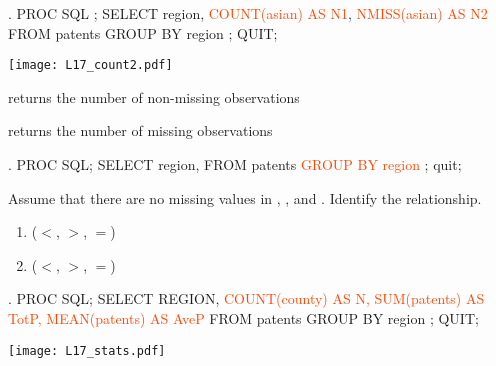 \begin{frame}[fragile]
\begin{code}{.}
PROC SQL ;
   SELECT region,
      \textcolor{OrangeRed}{COUNT(asian) AS N1},
      \textcolor{OrangeRed}{NMISS(asian) AS N2}
   FROM patents
   GROUP BY region
   ;
QUIT;
\end{code}
\emp
{} \hspace{0.05in} \emp
{}
\texttt{[image: L17\_count2.pdf]}
\emp
\bi
\item[]
\item {} returns the number of non-missing observations
\item {} returns the number of missing observations
\ei
\end{frame}


\begin{frame}[fragile]
\hspace*{-0.1in}
\begin{code}{.}
PROC SQL;
   SELECT
      region, \textcolor{OrangeRed}{}
   FROM patents
   \textcolor{OrangeRed}{GROUP BY region}
   ;
quit;
\end{code}
\emp
{}
\bi
\item {}
\item {}
\item {}
\ei
\emp
\vskip5pt
\begin{clicker}{Assume that there are no missing values in , , and .  Identify the relationship.}
\begin{enumerate}
\item {} ($<$, $>$, $=$) 
\item {} ($<$, $>$, $=$) 
\end{enumerate}
\end{clicker}
\end{frame}

\begin{frame}[fragile]
\hspace*{-0.3in}
\begin{code}{.}
PROC SQL;
   SELECT
      REGION,
      \textcolor{OrangeRed}{COUNT(county) AS N,}
      \textcolor{OrangeRed}{SUM(patents) AS TotP,}
      \textcolor{OrangeRed}{MEAN(patents) AS AveP}
   FROM patents
   GROUP BY region
   ;
QUIT;
\end{code}
\emp
\blankcolumn
{}
\texttt{[image: L17\_stats.pdf]}
\emp
\end{frame}

